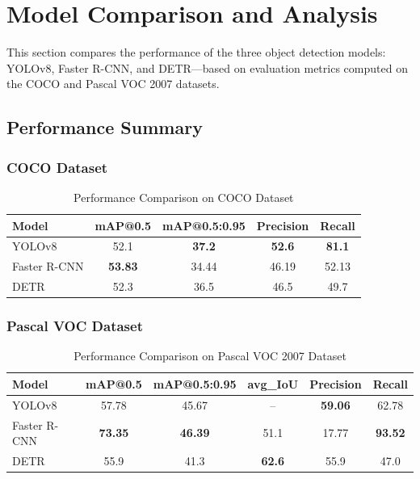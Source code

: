 \documentclass[12pt,a4paper]{article}
\begin{document}
\section{Model Comparison and Analysis}

This section compares the performance of the three object detection models: YOLOv8, Faster R-CNN, and DETR—based on evaluation metrics computed on the COCO and Pascal VOC 2007 datasets.

\subsection{Performance Summary}

\subsubsection{COCO Dataset}

\begin{table}[H]
    \centering
    \caption{Performance Comparison on COCO Dataset}
    \begin{tabular}{lcccc}
        \toprule
        \textbf{Model} & \textbf{mAP@0.5} & \textbf{mAP@0.5:0.95} & \textbf{Precision} & \textbf{Recall} \\
        \midrule
        YOLOv8        & 52.1  & \textbf{37.2} & \textbf{52.6} & \textbf{81.1} \\
        Faster R-CNN  & \textbf{53.83} & 34.44 & 46.19 & 52.13 \\
        DETR          & 52.3  & 36.5  & 46.5  & 49.7 \\
        \bottomrule
    \end{tabular}
\end{table}

\subsubsection{Pascal VOC Dataset}

\begin{table}[H]
    \centering
    \caption{Performance Comparison on Pascal VOC 2007 Dataset}
    \begin{tabular}{lccccc}
        \toprule
        \textbf{Model} & \textbf{mAP@0.5} & \textbf{mAP@0.5:0.95} & \textbf{avg\_IoU} & \textbf{Precision} & \textbf{Recall} \\
        \midrule
        YOLOv8        & 57.78 & 45.67 & --     & \textbf{59.06} & 62.78 \\
        Faster R-CNN  & \textbf{73.35} & \textbf{46.39} & 51.1  & 17.77 & \textbf{93.52} \\
        DETR          & 55.9  & 41.3  & \textbf{62.6}  & 55.9  & 47.0 \\
        \bottomrule
    \end{tabular}
\end{table}
\end{document}
